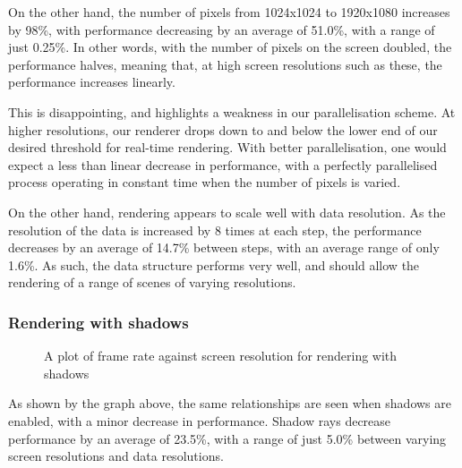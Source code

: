 On the other hand, the number of pixels from 1024x1024 to 1920x1080 increases by 98\%, with performance decreasing by an average of 51.0\%, with a range of just 0.25\%. In other words, with the number of pixels on the screen doubled, the performance halves, meaning that, at high screen resolutions such as these, the performance increases linearly.

This is disappointing, and highlights a weakness in our parallelisation scheme. At higher resolutions, our renderer drops down to and below the lower end of our desired threshold for real-time rendering. With better parallelisation, one would expect a less than linear decrease in performance, with a perfectly parallelised process operating in constant time when the number of pixels is varied.

On the other hand, rendering appears to scale well with data resolution. As the resolution of the data is increased by 8 times at each step, the performance decreases by an average of 14.7\% between steps, with an average range of only 1.6\%. As such, the data structure performs very well, and should allow the rendering of a range of scenes of varying resolutions.

\subsubsection{Rendering with shadows}
\begin{figure}[H]
\centering
{}

\caption{A plot of frame rate against screen resolution for rendering with shadows}
\end{figure}

As shown by the graph above, the same relationships are seen when shadows are enabled, with a minor decrease in performance. Shadow rays decrease performance by an average of 23.5\%, with a range of just 5.0\% between varying screen resolutions and data resolutions.

